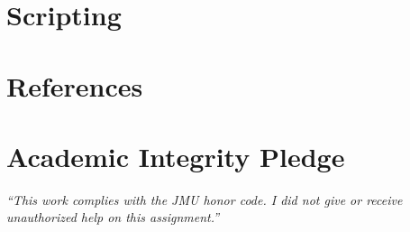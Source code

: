 \documentclass{article}
\begin{document}
\section*{Scripting}

%

%

\newpage
\section*{References}

\vfill 
  \section*{Academic Integrity Pledge}
   {\color{red}\textit{“This work complies with the JMU honor code. I did not give or receive unauthorized help on this assignment.”}}
\end{document}
